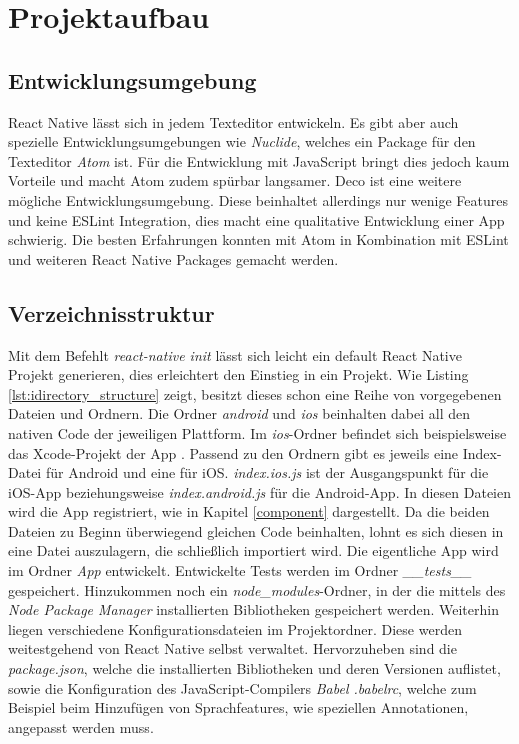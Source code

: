 \section{Projektaufbau}

\subsection{Entwicklungsumgebung}
React Native lässt sich in jedem Texteditor entwickeln. Es gibt aber auch spezielle Entwicklungsumgebungen wie \textit{Nuclide}, welches ein Package für den Texteditor \textit{Atom} ist. Für die Entwicklung mit JavaScript bringt dies jedoch kaum Vorteile und macht Atom zudem spürbar langsamer. Deco ist eine weitere mögliche Entwicklungsumgebung. Diese beinhaltet allerdings nur wenige Features und keine ESLint Integration, dies macht eine qualitative Entwicklung einer App schwierig. Die besten Erfahrungen konnten mit Atom in Kombination mit ESLint und weiteren React Native Packages gemacht werden. 

\subsection{Verzeichnisstruktur}
Mit dem Befehlt \textit{react-native init} lässt sich leicht ein default React Native Projekt generieren, dies erleichtert den Einstieg in ein Projekt. Wie Listing \ref{lst:idirectory_structure} zeigt, besitzt dieses schon eine Reihe von vorgegebenen Dateien und Ordnern. Die Ordner \textit{android} und \textit{ios} beinhalten dabei all den nativen Code der jeweiligen Plattform. Im \textit{ios}-Ordner befindet sich beispielsweise das Xcode-Projekt der App \cite{carli_project_2016}. Passend zu den Ordnern gibt es jeweils eine Index-Datei für Android und eine für iOS. \textit{index.ios.js} ist der Ausgangspunkt für die iOS-App beziehungsweise \textit{index.android.js} für die Android-App. In diesen Dateien wird die App registriert, wie in Kapitel \ref{component} dargestellt. Da die beiden Dateien zu Beginn überwiegend gleichen Code beinhalten, lohnt es sich diesen in eine Datei auszulagern, die schließlich importiert wird. Die eigentliche App wird im Ordner \textit{App} entwickelt. Entwickelte Tests werden im Ordner \textit{\_\_tests\_\_} gespeichert. Hinzukommen noch ein \textit{node\_modules}-Ordner, in der die mittels des \textit{Node Package Manager} installierten Bibliotheken gespeichert werden. Weiterhin liegen verschiedene Konfigurationsdateien im Projektordner. Diese werden weitestgehend von React Native selbst verwaltet. Hervorzuheben sind die \textit{package.json}, welche die installierten Bibliotheken und deren Versionen auflistet, sowie die Konfiguration des JavaScript-Compilers \textit{Babel .babelrc}, welche zum Beispiel beim Hinzufügen von Sprachfeatures, wie speziellen Annotationen, angepasst werden muss. 

